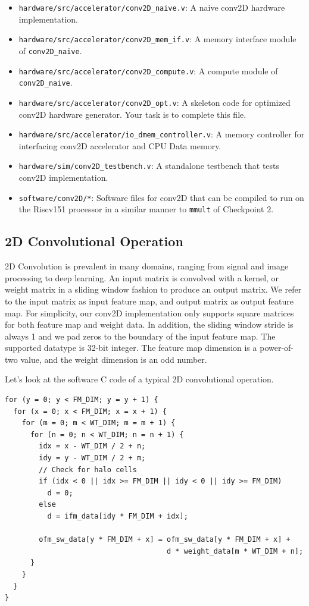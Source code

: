 \documentclass[11pt]{article}
\begin{document}
\begin{itemize}
\item \verb|hardware/src/accelerator/conv2D_naive.v|: A naive conv2D hardware implementation.
\item \verb|hardware/src/accelerator/conv2D_mem_if.v|: A memory interface module of \texttt{conv2D\_naive}.
\item \verb|hardware/src/accelerator/conv2D_compute.v|: A compute module of \texttt{conv2D\_naive}.
\item \verb|hardware/src/accelerator/conv2D_opt.v|: A skeleton code for optimized conv2D hardware generator. Your task is to complete this file.
\item \verb|hardware/src/accelerator/io_dmem_controller.v|: A memory controller for interfacing conv2D accelerator and CPU Data memory.
\item \verb|hardware/sim/conv2D_testbench.v|: A standalone testbench that tests conv2D implementation.
\item \verb|software/conv2D/*|: Software files for conv2D that can be compiled to run on the Riscv151 processor in a similar manner to \texttt{mmult} of Checkpoint 2.
\end{itemize}

\subsection{2D Convolutional Operation}

2D Convolution is prevalent in many domains, ranging from signal and image processing to deep learning. An input matrix is convolved with a kernel, or weight matrix in a sliding window fashion to produce an output matrix. We refer to the input matrix as input feature map, and output matrix as output feature map. For simplicity, our conv2D implementation only supports square matrices for both feature map and weight data. In addition, the sliding window stride is always 1 and we pad zeros to the boundary of the input feature map. The supported datatype is 32-bit integer. The feature map dimension is a power-of-two value, and the weight dimension is an odd number.

Let's look at the software C code of a typical 2D convolutional operation.

\begin{verbatim}
for (y = 0; y < FM_DIM; y = y + 1) {
  for (x = 0; x < FM_DIM; x = x + 1) {
    for (m = 0; m < WT_DIM; m = m + 1) {
      for (n = 0; n < WT_DIM; n = n + 1) {
        idx = x - WT_DIM / 2 + n;
        idy = y - WT_DIM / 2 + m;
        // Check for halo cells
        if (idx < 0 || idx >= FM_DIM || idy < 0 || idy >= FM_DIM)
          d = 0;
        else
          d = ifm_data[idy * FM_DIM + idx];

        ofm_sw_data[y * FM_DIM + x] = ofm_sw_data[y * FM_DIM + x] +
                                      d * weight_data[m * WT_DIM + n];
      }
    }
  }
}
\end{verbatim}
\end{document}
